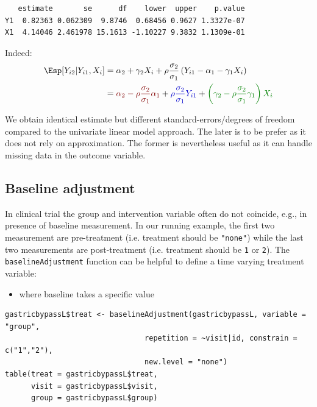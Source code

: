 \documentclass[12pt]{article}
\newcommand{\darkblue}{blue!80!black}
\newcommand{\darkgreen}{green!50!black}
\newcommand{\darkred}{red!50!black}
\begin{document}
\begin{verbatim}
   estimate       se      df    lower  upper    p.value
Y1  0.82363 0.062309  9.8746  0.68456 0.9627 1.3327e-07
X1  4.14046 2.461978 15.1613 -1.10227 9.3832 1.1309e-01
\end{verbatim}


Indeed:
\begin{align*}
\Esp[Y_{i2}|Y_{i1},X_{i}] &= \alpha_2 + \gamma_2 X_{i} + \rho \frac{\sigma_2}{\sigma_1}\left(Y_{i1} - \alpha_1 - \gamma_1 X_{i}\right) \\
                         &= \textcolor{\darkred}{\alpha_2 - \rho \frac{\sigma_2}{\sigma_1} \alpha_1}
                         + \textcolor{\darkblue}{\rho \frac{\sigma_2}{\sigma_1}Y_{i1}}
                         + \textcolor{\darkgreen}{\left(\gamma_2 - \rho \frac{\sigma_2}{\sigma_1} \gamma_1\right)  X_{i} }
\end{align*}

We obtain identical estimate but different standard-errors/degrees of
freedom compared to the univariate linear model approach. The later is
to be prefer as it does not rely on approximation. The former is
nevertheless useful as it can handle missing data in the outcome
variable.

\clearpage

\subsection{Baseline adjustment}
\label{sec:orgad6c508}

In clinical trial the group and intervention variable often do not
coincide, e.g., in presence of baseline measurement. In our running
example, the first two measurement are pre-treatment (i.e. treatment
should be \texttt{"none"}) while the last two measurements are post-treatment
(i.e. treatment should be \texttt{1} or \texttt{2}). The \texttt{baselineAdjustment}
function can be helpful to define a time varying treatment variable:
\begin{itemize}
\item where baseline takes a specific value
\end{itemize}
\lstset{language=r,label= ,caption= ,captionpos=b,numbers=none}
\begin{lstlisting}
gastricbypassL$treat <- baselineAdjustment(gastricbypassL, variable = "group",
                                repetition = ~visit|id, constrain = c("1","2"),
                                new.level = "none")
table(treat = gastricbypassL$treat,
      visit = gastricbypassL$visit,
      group = gastricbypassL$group)
\end{lstlisting}
\end{document}
